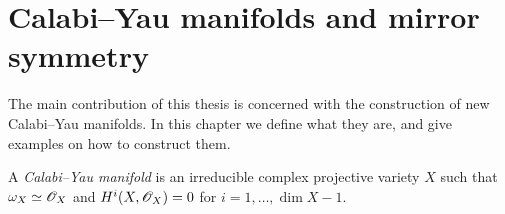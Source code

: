







\section{Calabi--Yau manifolds and mirror symmetry} %
\label{sec:calabi_yau}

The main contribution of this thesis is concerned with the construction of new Calabi--Yau manifolds. In this chapter we define what they are, and give examples on how to construct them.

\begin{definition}
A \emph{Calabi--Yau manifold} is an irreducible complex projective variety $X$ such that $\omega_X \simeq \mathscr{O}_X$ and $H^i(X,\mathscr{O}_X)=0$ for $i=1,\ldots,\dim X-1$.
\end{definition}

